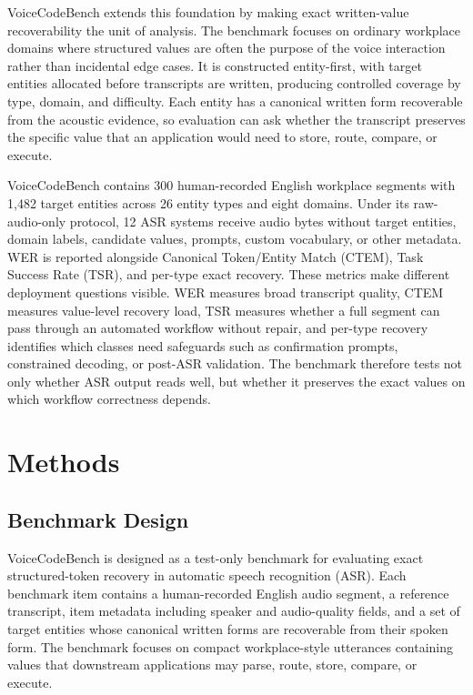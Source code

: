 \documentclass[10pt,twocolumn]{article}
\begin{document}
VoiceCodeBench extends this foundation by making exact written-value
recoverability the unit of analysis. The benchmark focuses on ordinary
workplace domains where structured values are often the purpose of the
voice interaction rather than incidental edge cases. It is constructed
entity-first, with target entities allocated before transcripts are
written, producing controlled coverage by type, domain, and difficulty.
Each entity has a canonical written form recoverable from the acoustic
evidence, so evaluation can ask whether the transcript preserves the
specific value that an application would need to store, route, compare,
or execute.

VoiceCodeBench contains 300 human-recorded English workplace segments
with 1,482 target entities across 26 entity types and eight domains.
Under its raw-audio-only protocol, 12 ASR systems receive audio bytes
without target entities, domain labels, candidate values, prompts, custom
vocabulary, or other metadata. WER is reported alongside Canonical
Token/Entity Match (CTEM), Task Success Rate (TSR), and per-type exact
recovery. These metrics make different deployment questions visible.
WER measures broad transcript quality, CTEM measures value-level recovery
load, TSR measures whether a full segment can pass through an automated
workflow without repair, and per-type recovery identifies which classes
need safeguards such as confirmation prompts, constrained decoding, or
post-ASR validation. The benchmark therefore tests not only whether ASR
output reads well, but whether it preserves the exact values on which
workflow correctness depends.

\section{Methods}\label{methods}

\subsection{Benchmark Design}\label{benchmark-design}

VoiceCodeBench is designed as a test-only benchmark for evaluating
exact structured-token recovery in automatic speech recognition (ASR).
Each benchmark item contains a human-recorded English audio segment, a
reference transcript, item metadata including speaker and audio-quality
fields, and a set of target entities whose canonical written forms are
recoverable from their spoken form. The benchmark focuses on compact
workplace-style utterances containing values that downstream
applications may parse, route, store, compare, or execute.
\end{document}
